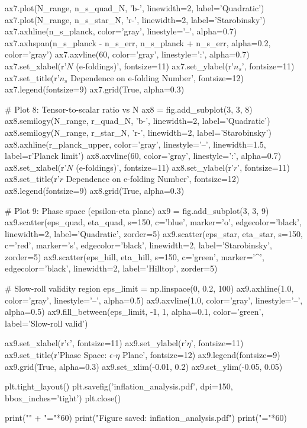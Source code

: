 \documentclass[a4paper, 11pt]{article}
\begin{document}
\begin{pycode}
ax7.plot(N_range, n_s_quad_N, 'b-', linewidth=2, label='Quadratic')
ax7.plot(N_range, n_s_star_N, 'r-', linewidth=2, label='Starobinsky')
ax7.axhline(n_s_planck, color='gray', linestyle='--', alpha=0.7)
ax7.axhspan(n_s_planck - n_s_err, n_s_planck + n_s_err,
            alpha=0.2, color='gray')
ax7.axvline(60, color='gray', linestyle=':', alpha=0.7)
ax7.set_xlabel(r'$N$ (e-foldings)', fontsize=11)
ax7.set_ylabel(r'$n_s$', fontsize=11)
ax7.set_title(r'$n_s$ Dependence on e-folding Number', fontsize=12)
ax7.legend(fontsize=9)
ax7.grid(True, alpha=0.3)

# Plot 8: Tensor-to-scalar ratio vs N
ax8 = fig.add_subplot(3, 3, 8)
ax8.semilogy(N_range, r_quad_N, 'b-', linewidth=2, label='Quadratic')
ax8.semilogy(N_range, r_star_N, 'r-', linewidth=2, label='Starobinsky')
ax8.axhline(r_planck_upper, color='gray', linestyle='--', linewidth=1.5,
            label=r'Planck limit')
ax8.axvline(60, color='gray', linestyle=':', alpha=0.7)
ax8.set_xlabel(r'$N$ (e-foldings)', fontsize=11)
ax8.set_ylabel(r'$r$', fontsize=11)
ax8.set_title(r'$r$ Dependence on e-folding Number', fontsize=12)
ax8.legend(fontsize=9)
ax8.grid(True, alpha=0.3)

# Plot 9: Phase space (epsilon-eta plane)
ax9 = fig.add_subplot(3, 3, 9)
ax9.scatter(eps_quad, eta_quad, s=150, c='blue', marker='o',
            edgecolor='black', linewidth=2, label='Quadratic', zorder=5)
ax9.scatter(eps_star, eta_star, s=150, c='red', marker='s',
            edgecolor='black', linewidth=2, label='Starobinsky', zorder=5)
ax9.scatter(eps_hill, eta_hill, s=150, c='green', marker='^',
            edgecolor='black', linewidth=2, label='Hilltop', zorder=5)

# Slow-roll validity region
eps_limit = np.linspace(0, 0.2, 100)
ax9.axhline(1.0, color='gray', linestyle='--', alpha=0.5)
ax9.axvline(1.0, color='gray', linestyle='--', alpha=0.5)
ax9.fill_between(eps_limit, -1, 1, alpha=0.1, color='green',
                  label='Slow-roll valid')

ax9.set_xlabel(r'$\epsilon$', fontsize=11)
ax9.set_ylabel(r'$\eta$', fontsize=11)
ax9.set_title(r'Phase Space: $\epsilon$-$\eta$ Plane', fontsize=12)
ax9.legend(fontsize=9)
ax9.grid(True, alpha=0.3)
ax9.set_xlim(-0.01, 0.2)
ax9.set_ylim(-0.05, 0.05)

plt.tight_layout()
plt.savefig('inflation_analysis.pdf', dpi=150, bbox_inches='tight')
plt.close()

print("\n" + "="*60)
print("Figure saved: inflation_analysis.pdf")
print("="*60)
\end{pycode}
\end{document}
